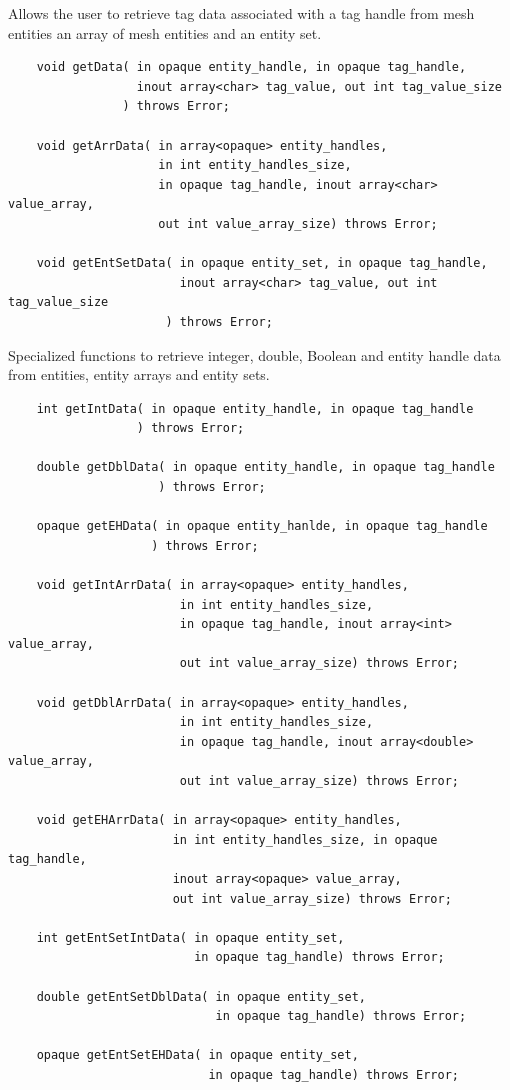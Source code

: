 \documentclass{article}
\begin{document}
Allows the user to retrieve tag data associated with a tag handle 
from mesh entities an array of mesh entities and an entity set. 
\begin{verbatim} 
    void getData( in opaque entity_handle, in opaque tag_handle, 
                  inout array<char> tag_value, out int tag_value_size
                ) throws Error;

    void getArrData( in array<opaque> entity_handles, 
                     in int entity_handles_size, 
                     in opaque tag_handle, inout array<char> value_array, 
                     out int value_array_size) throws Error;

    void getEntSetData( in opaque entity_set, in opaque tag_handle, 
                        inout array<char> tag_value, out int tag_value_size
                      ) throws Error;

\end{verbatim}

Specialized functions to retrieve integer, double, Boolean and 
entity handle data from entities, entity arrays and entity sets.
\begin{verbatim}
    int getIntData( in opaque entity_handle, in opaque tag_handle
                  ) throws Error;

    double getDblData( in opaque entity_handle, in opaque tag_handle
                     ) throws Error;

    opaque getEHData( in opaque entity_hanlde, in opaque tag_handle
                    ) throws Error; 

    void getIntArrData( in array<opaque> entity_handles, 
                        in int entity_handles_size, 
                        in opaque tag_handle, inout array<int> value_array, 
                        out int value_array_size) throws Error;

    void getDblArrData( in array<opaque> entity_handles, 
                        in int entity_handles_size, 
                        in opaque tag_handle, inout array<double> value_array, 
                        out int value_array_size) throws Error;

    void getEHArrData( in array<opaque> entity_handles, 
                       in int entity_handles_size, in opaque tag_handle, 
                       inout array<opaque> value_array,  
                       out int value_array_size) throws Error;

    int getEntSetIntData( in opaque entity_set,  
                          in opaque tag_handle) throws Error;

    double getEntSetDblData( in opaque entity_set, 
                             in opaque tag_handle) throws Error;
    
    opaque getEntSetEHData( in opaque entity_set,  
                            in opaque tag_handle) throws Error;
\end{verbatim}
\end{document}
